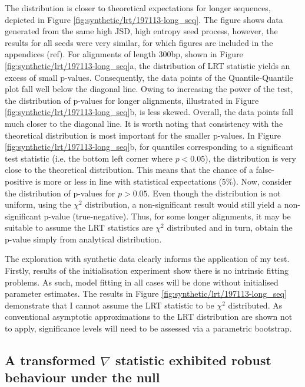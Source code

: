 The distribution is closer to theoretical expectations for longer sequences, depicted in Figure \ref{fig:synthetic/lrt/197113-long_seq}. The figure shows data generated from the same high JSD, high entropy seed process, however, the results for all seeds were very similar, for which figures are included in the appendices (ref). For alignments of length 300bp, shown in Figure \ref{fig:synthetic/lrt/197113-long_seq}a, the distribution of LRT statistic yields an excess of small p-values. Consequently, the data points of the Quantile-Quantile plot fall well below the diagonal line. Owing to increasing the power of the test, the distribution of p-values for longer alignments, illustrated in Figure \ref{fig:synthetic/lrt/197113-long_seq}b, is less skewed. Overall, the data points fall much closer to the diagonal line. It is worth noting that consistency with the theoretical distribution is most important for the smaller p-values. In Figure \ref{fig:synthetic/lrt/197113-long_seq}b, for quantiles corresponding to a significant test statistic (i.e. the bottom left corner where $p<0.05$), the distribution is very close to the theoretical distribution. This means that the chance of a false-positive is more or less in line with statistical expectations (5\%). Now, consider the distribution of p-values for $p>0.05$. Even though the distribution is not uniform, using the $\chi^{2}$ distribution, a non-significant result would still yield a non-significant p-value (true-negative). Thus, for some longer alignments, it may be suitable to assume the LRT statistics are $\chi^{2}$ distributed and in turn, obtain the p-value simply from analytical distribution. 



The exploration with synthetic data clearly informs the application of my test. Firstly, results of the initialisation experiment show there is no intrinsic fitting problems. As such, model fitting in all cases will be done without initialised parameter estimates. The results in Figure \ref{fig:synthetic/lrt/197113-long_seq} demonstrate that I cannot assume the LRT statistic to be $\chi^{2}$ distributed. As conventional asymptotic approximations to the LRT distribution are shown not to apply, significance levels will need to be assessed via a parametric bootstrap. 

\subsection*{A transformed $\nabla$ statistic exhibited robust behaviour under the null}

